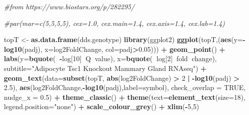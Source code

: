 \documentclass[]{article}
\newenvironment{Shaded}{\begin{snugshade}}{\end{snugshade}}
\newcommand{\CommentTok}[1]{\textcolor[rgb]{0.56,0.35,0.01}{\textit{#1}}}
\newcommand{\DataTypeTok}[1]{\textcolor[rgb]{0.13,0.29,0.53}{#1}}
\newcommand{\DecValTok}[1]{\textcolor[rgb]{0.00,0.00,0.81}{#1}}
\newcommand{\FloatTok}[1]{\textcolor[rgb]{0.00,0.00,0.81}{#1}}
\newcommand{\KeywordTok}[1]{\textcolor[rgb]{0.13,0.29,0.53}{\textbf{#1}}}
\newcommand{\NormalTok}[1]{#1}
\newcommand{\OperatorTok}[1]{\textcolor[rgb]{0.81,0.36,0.00}{\textbf{#1}}}
\newcommand{\OtherTok}[1]{\textcolor[rgb]{0.56,0.35,0.01}{#1}}
\newcommand{\StringTok}[1]{\textcolor[rgb]{0.31,0.60,0.02}{#1}}
\begin{document}
\begin{Shaded}
\begin{Highlighting}[]
\CommentTok{#from https://www.biostars.org/p/282295/}

\CommentTok{#par(mar=c(5,5,5,5), cex=1.0, cex.main=1.4, cex.axis=1.4, cex.lab=1.4)}

\NormalTok{topT <-}\StringTok{ }\KeywordTok{as.data.frame}\NormalTok{(dds.genotype)}
\KeywordTok{library}\NormalTok{(ggplot2)}
\KeywordTok{ggplot}\NormalTok{(topT,(}\KeywordTok{aes}\NormalTok{(}\DataTypeTok{y=}\OperatorTok{-}\KeywordTok{log10}\NormalTok{(padj),}
                \DataTypeTok{x=}\NormalTok{log2FoldChange,}
                \DataTypeTok{col=}\NormalTok{padj}\OperatorTok{>}\FloatTok{0.05}\NormalTok{))) }\OperatorTok{+}
\StringTok{  }\KeywordTok{geom_point}\NormalTok{() }\OperatorTok{+}
\StringTok{  }\KeywordTok{labs}\NormalTok{(}\DataTypeTok{y=}\KeywordTok{bquote}\NormalTok{(}\OperatorTok{~-}\NormalTok{log[}\DecValTok{10}\NormalTok{]}\OperatorTok{~}\NormalTok{Q}\OperatorTok{~}\NormalTok{value),}
       \DataTypeTok{x=}\KeywordTok{bquote}\NormalTok{(}\OperatorTok{~}\NormalTok{log[}\DecValTok{2}\NormalTok{]}\OperatorTok{~}\NormalTok{fold}\OperatorTok{~}\NormalTok{change),}
       \DataTypeTok{subtitle=}\StringTok{"Adipocyte Tsc1 Knockout Mammary Gland RNAseq"}\NormalTok{) }\OperatorTok{+}
\StringTok{    }\KeywordTok{geom_text}\NormalTok{(}\DataTypeTok{data=}\KeywordTok{subset}\NormalTok{(topT, }\KeywordTok{abs}\NormalTok{(log2FoldChange) }\OperatorTok{>}\StringTok{ }\DecValTok{2} \OperatorTok{|}\StringTok{ }\OperatorTok{-}\KeywordTok{log10}\NormalTok{(padj) }\OperatorTok{>}\StringTok{ }\FloatTok{2.5}\NormalTok{),}
            \KeywordTok{aes}\NormalTok{(log2FoldChange,}\OperatorTok{-}\KeywordTok{log10}\NormalTok{(padj),}\DataTypeTok{label=}\NormalTok{symbol),}
            \DataTypeTok{check_overlap =} \OtherTok{TRUE}\NormalTok{, }\DataTypeTok{nudge_x =} \FloatTok{0.5}\NormalTok{) }\OperatorTok{+}
\StringTok{  }\KeywordTok{theme_classic}\NormalTok{() }\OperatorTok{+}
\StringTok{  }\KeywordTok{theme}\NormalTok{(}\DataTypeTok{text=}\KeywordTok{element_text}\NormalTok{(}\DataTypeTok{size=}\DecValTok{18}\NormalTok{),}
        \DataTypeTok{legend.position=}\StringTok{"none"}\NormalTok{) }\OperatorTok{+}
\StringTok{  }\KeywordTok{scale_colour_grey}\NormalTok{() }\OperatorTok{+}
\StringTok{  }\KeywordTok{xlim}\NormalTok{(}\OperatorTok{-}\DecValTok{5}\NormalTok{,}\DecValTok{5}\NormalTok{)}
\end{Highlighting}
\end{Shaded}
\end{document}
